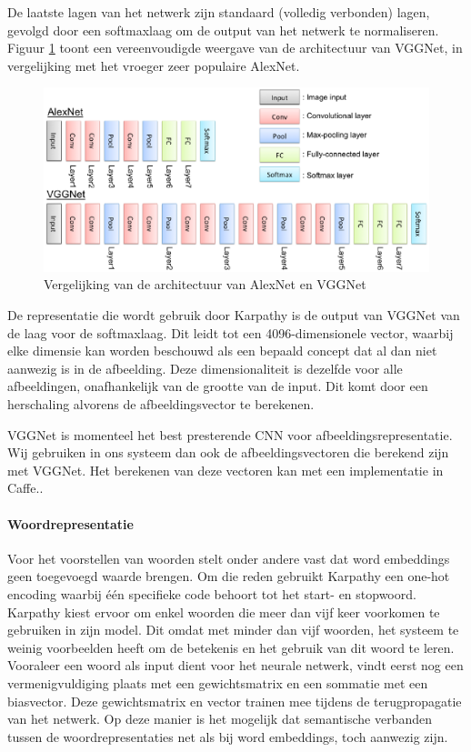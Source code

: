 De laatste lagen van het netwerk zijn standaard (volledig verbonden) lagen, gevolgd door een softmaxlaag om de output van het netwerk te normaliseren. Figuur \ref{fig:alexvgg} toont een vereenvoudigde weergave van de architectuur van VGGNet, in vergelijking met het vroeger zeer populaire AlexNet\cite{Krizhevsky2012a}.

\begin{figure}[tb]
    \centering
    \includegraphics[width=\linewidth]{Images/alex_vgg.eps}
    \caption{Vergelijking van de architectuur van AlexNet en VGGNet}
    \label{fig:alexvgg}
\end{figure}


De representatie die wordt gebruik door Karpathy is de output van VGGNet van de laag voor de softmaxlaag. Dit leidt tot een 4096-dimensionele vector, waarbij elke dimensie kan worden beschouwd als een bepaald concept dat al dan niet aanwezig is in de afbeelding. Deze dimensionaliteit is dezelfde voor alle afbeeldingen, onafhankelijk van de grootte van de input. Dit komt door een herschaling alvorens de afbeeldingsvector te berekenen.

VGGNet is momenteel het best presterende CNN voor afbeeldingsrepresentatie. Wij gebruiken in ons systeem dan ook de afbeeldingsvectoren die berekend zijn met VGGNet. Het berekenen van deze vectoren kan met een implementatie in Caffe.\cite{Jia2014}.

\paragraph{Woordrepresentatie}
Voor het voorstellen van woorden stelt onder andere  vast dat word embeddings geen toegevoegd waarde brengen. Om die reden gebruikt Karpathy een one-hot encoding waarbij \'e\'en specifieke code behoort tot het start- en stopwoord. Karpathy kiest ervoor om enkel woorden die meer dan vijf keer voorkomen te gebruiken in zijn model. Dit omdat met minder dan vijf woorden, het systeem te weinig voorbeelden heeft om de betekenis en het gebruik van dit woord te leren. Vooraleer een woord als input dient voor het neurale netwerk, vindt eerst nog een vermenigvuldiging plaats met een gewichtsmatrix en een sommatie met een biasvector. Deze gewichtsmatrix en vector trainen mee tijdens de terugpropagatie van het netwerk. Op deze manier is het mogelijk dat semantische verbanden tussen de woordrepresentaties net als bij word embeddings, toch aanwezig zijn.

